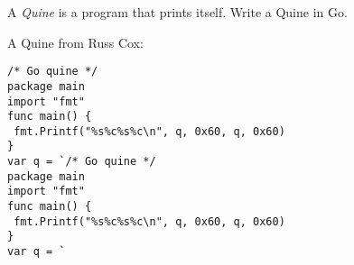 \begin{Exercise}[title={Quine},difficulty=9]
A \emph{Quine} is a program that prints itself.
\label{ex:quine}
\Question\label{ex:quine q1} Write a Quine in Go.
\end{Exercise}

\begin{Answer}
A Quine from Russ Cox:
\begin{lstlisting}
/* Go quine */
package main
import "fmt"
func main() {
 fmt.Printf("%s%c%s%c\n", q, 0x60, q, 0x60)
}
var q = `/* Go quine */
package main
import "fmt"
func main() {
 fmt.Printf("%s%c%s%c\n", q, 0x60, q, 0x60)
}
var q = `
\end{lstlisting}

\end{Answer}
